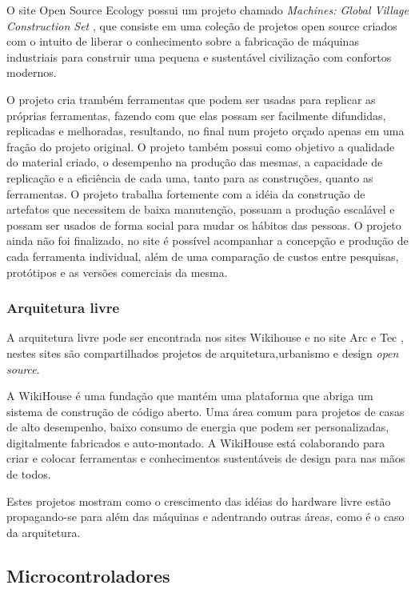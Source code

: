 \documentclass[final,12pt, times, 5p, twocolumn]{elsarticle}
\begin{document}
O site Open Source Ecology \cite{Open Source Ecology} possui um projeto chamado \textit{Machines: Global Village Construction Set} \cite{Machines: Global Village Construction Set}, que consiste em uma coleção de projetos open source criados com o intuito de liberar o conhecimento sobre a fabricação de máquinas industriais  para construir uma pequena e sustentável civilização com confortos modernos.

O projeto cria trambém ferramentas que podem ser usadas para replicar as próprias ferramentas, fazendo com que elas possam ser facilmente difundidas, replicadas e melhoradas, resultando, no final num projeto orçado apenas em uma fração do projeto original. O projeto também possui como objetivo a qualidade do material criado, o desempenho na produção das mesmas, a capacidade de replicação e a eficiência de cada uma, tanto para as construções, quanto as ferramentas. O projeto trabalha fortemente com a idéia da construção de artefatos que necessitem de baixa manutenção, possuam a produção escalável e possam ser usados de forma social para mudar os hábitos das pessoas. O projeto ainda não foi finalizado, no site é possível acompanhar a concepção e produção de cada ferramenta individual, além de uma comparação de custos entre pesquisas, protótipos e as versões comerciais da mesma.

\subsubsection{Arquitetura livre}

A arquitetura livre pode ser encontrada nos sites Wikihouse \cite{Wikihouse} e no site Arc e Tec \cite{Arc e Tec}, nestes sites são compartilhados projetos de arquitetura,urbanismo e design \textit{open source}.

A WikiHouse é uma fundação que mantém uma plataforma que abriga um sistema de construção de código aberto. Uma área comum para projetos de casas de alto desempenho, baixo consumo de energia que podem ser personalizadas, digitalmente fabricados e auto-montado. A WikiHouse está colaborando para criar e colocar ferramentas e conhecimentos sustentáveis de design para nas mãos de todos.

Estes projetos mostram como o crescimento das idéias do hardware livre estão propagando-se para além das máquinas e adentrando outras áreas, como é o caso da arquitetura.

\subsection{Microcontroladores}
\end{document}

